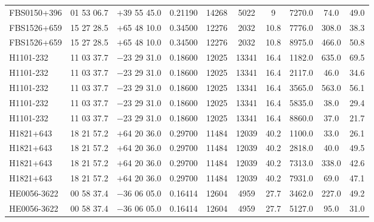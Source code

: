 \begin{landscape}
\begin{center}
\begin{longtable}{l c c c c c c c c c}
FBS0150+396  &             01 53 06.7  &         $+$39 55 45.0  &       0.21190  & 14268  &   5022  &       9  &         7270.0  &  74.0  &   49.0  \\
FBS1526+659  &             15 27 28.5  &         $+$65 48 10.0  &       0.34500  & 12276  &   2032  &       10.8  &      7776.0  &  308.0  &  38.3  \\
FBS1526+659  &             15 27 28.5  &         $+$65 48 10.0  &       0.34500  & 12276  &   2032  &       10.8  &      8975.0  &  466.0  &  50.8  \\
H1101-232  &               11 03 37.7  &         $-$23 29 31.0  &       0.18600  & 12025  &   13341  &      16.4  &      1182.0  &  635.0  &  69.5  \\
H1101-232  &               11 03 37.7  &         $-$23 29 31.0  &       0.18600  & 12025  &   13341  &      16.4  &      2117.0  &  46.0  &   34.6  \\
H1101-232  &               11 03 37.7  &         $-$23 29 31.0  &       0.18600  & 12025  &   13341  &      16.4  &      3565.0  &  563.0  &  56.1  \\
H1101-232  &               11 03 37.7  &         $-$23 29 31.0  &       0.18600  & 12025  &   13341  &      16.4  &      5835.0  &  38.0  &   29.4  \\
H1101-232  &               11 03 37.7  &         $-$23 29 31.0  &       0.18600  & 12025  &   13341  &      16.4  &      8860.0  &  37.0  &   21.7  \\
H1821+643  &               18 21 57.2  &         $+$64 20 36.0  &       0.29700  & 11484  &   12039  &      40.2  &      1100.0  &  33.0  &   26.1  \\
H1821+643  &               18 21 57.2  &         $+$64 20 36.0  &       0.29700  & 11484  &   12039  &      40.2  &      2818.0  &  40.0  &   49.5  \\
H1821+643  &               18 21 57.2  &         $+$64 20 36.0  &       0.29700  & 11484  &   12039  &      40.2  &      7313.0  &  338.0  &  42.6  \\
H1821+643  &               18 21 57.2  &         $+$64 20 36.0  &       0.29700  & 11484  &   12039  &      40.2  &      7931.0  &  69.0  &   47.1  \\
HE0056-3622  &             00 58 37.4  &         $-$36 06 05.0  &       0.16414  & 12604  &   4959  &       27.7  &      3462.0  &  227.0  &  49.2  \\
HE0056-3622  &             00 58 37.4  &         $-$36 06 05.0  &       0.16414  & 12604  &   4959  &       27.7  &      5127.0  &  95.0  &   31.0  \\

\end{longtable}
\end{center}
\end{landscape}
